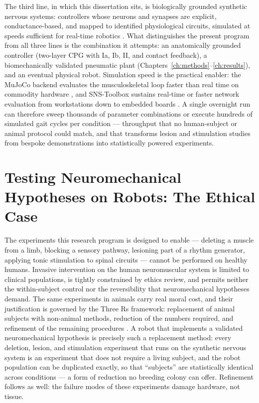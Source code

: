 The third line, in which this dissertation sits, is biologically grounded
synthetic nervous systems: controllers whose neurons and synapses are explicit,
conductance-based, and mapped to identified physiological circuits, simulated at
speeds sufficient for real-time robotics \citep{nourse_sns_2023}. What
distinguishes the present program from all three lines is the combination it
attempts: an anatomically grounded controller (two-layer CPG with Ia, Ib, II,
and contact feedback), a biomechanically validated pneumatic plant
(Chapters~\ref{ch:methods}--\ref{ch:results}), and an eventual physical robot.
Simulation speed is the practical enabler: the MuJoCo backend evaluates the
musculoskeletal loop faster than real time on commodity hardware
\citep{todorov_mujoco_2012, caggiano_myosuite_2022}, and SNS-Toolbox sustains
real-time or faster network evaluation from workstations down to embedded boards
\citep{nourse_sns_2023}. A single overnight run can therefore sweep thousands of
parameter combinations or execute hundreds of simulated gait cycles per
condition --- throughput that no human-subject or animal protocol could match,
and that transforms lesion and stimulation studies from bespoke demonstrations
into statistically powered experiments.

\section{Testing Neuromechanical Hypotheses on Robots: The Ethical Case}\label{sec:bg_ethics}

The experiments this research program is designed to enable --- deleting a
muscle from a limb, blocking a sensory pathway, lesioning part of a rhythm
generator, applying tonic stimulation to spinal circuits --- cannot be performed
on healthy humans. Invasive intervention on the human neuromuscular system is
limited to clinical populations, is tightly constrained by ethics review, and
permits neither the within-subject control nor the reversibility that
neuromechanical hypotheses demand. The same experiments in animals carry real
moral cost, and their justification is governed by the Three Rs framework:
replacement of animal subjects with non-animal methods, reduction of the numbers
required, and refinement of the remaining procedures
\citep{russell_principles_1959, tannenbaum_russell_2015}. A robot that implements
a validated neuromechanical hypothesis is precisely such a replacement method:
every deletion, lesion, and stimulation experiment that runs on the synthetic
nervous system is an experiment that does not require a living subject, and the
robot population can be duplicated exactly, so that ``subjects'' are
statistically identical across conditions --- a form of reduction no breeding
colony can offer. Refinement follows as well: the failure modes of these
experiments damage hardware, not tissue.

